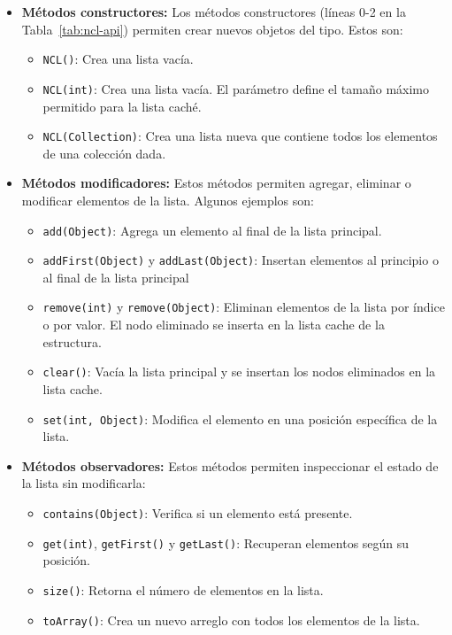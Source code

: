 \begin{itemize}
    \item \textbf{Métodos constructores:}
    Los métodos constructores (líneas 0-2 en la Tabla~\ref{tab:ncl-api}) permiten crear nuevos objetos del tipo. Estos son:
    \begin{itemize}
        \item \texttt{NCL()}: Crea una lista vacía.
        \item \texttt{NCL(int)}: Crea una lista vacía. El parámetro define el
            tamaño máximo permitido para la lista caché.
        \item \texttt{NCL(Collection)}: Crea una lista nueva que contiene todos los elementos de una colección dada.
    \end{itemize}
    \item \textbf{Métodos modificadores:}
    Estos métodos permiten agregar, eliminar o modificar elementos de la lista. Algunos ejemplos son:
    \begin{itemize}
        \item \texttt{add(Object)}: Agrega un elemento al final de la lista
            principal. 
        \item \texttt{addFirst(Object)} y \texttt{addLast(Object)}: Insertan elementos al principio o al final de la lista principal 
        \item \texttt{remove(int)} y \texttt{remove(Object)}: Eliminan elementos de la lista por índice o por valor. El nodo eliminado se inserta en la lista cache de la estructura.
        \item \texttt{clear()}: Vacía la lista principal y se insertan los nodos
            eliminados en la lista cache.
        \item \texttt{set(int, Object)}: Modifica el elemento en una posición específica de la lista.
    \end{itemize}
    \item \textbf{Métodos observadores:}  
    Estos métodos permiten inspeccionar el estado de la lista sin modificarla:
    \begin{itemize}
        \item \texttt{contains(Object)}: Verifica si un elemento está presente.
        \item \texttt{get(int)}, \texttt{getFirst()} y \texttt{getLast()}: Recuperan elementos según su posición.
        \item \texttt{size()}: Retorna el número de elementos en la lista.
        \item \texttt{toArray()}: Crea un nuevo arreglo con todos los elementos de la lista.
    \end{itemize}
\end{itemize}

